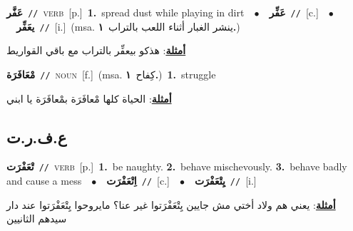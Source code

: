 \documentclass[10pt,a4paper,twoside]{article} %
\begin{document}
\begin{multicols}{2}
{\setlength\topsep{0pt}\textbf{\foreignlanguage{arabic}{عَفَّر}}\ {\color{gray}\texttt{//}\color{black}}\ \textsc{verb}\ [p.]\ \textbf{1.}~spread dust while playing in dirt\ \ $\bullet$\ \ \setlength\topsep{0pt}\textbf{\foreignlanguage{arabic}{عَفِّر}}\ {\color{gray}\texttt{//}\color{black}}\ [c.]\ \ $\bullet$\ \ \setlength\topsep{0pt}\textbf{\foreignlanguage{arabic}{يعَفِّر}}\ {\color{gray}\texttt{//}\color{black}}\ [i.]\ \color{gray}(msa. \foreignlanguage{arabic}{ينشر الغبار أثناء اللعب بالتراب}~\foreignlanguage{arabic}{\textbf{١.}})\color{black}\  \begin{flushright}\color{gray}\foreignlanguage{arabic}{\textbf{\underline{\foreignlanguage{arabic}{أمثلة}}}: هذكو بيعفِّر بالتراب مع باقي القواريط}\end{flushright}\color{black}} \vspace{2mm}

{\setlength\topsep{0pt}\textbf{\foreignlanguage{arabic}{مْعَافَرَة}}\ {\color{gray}\texttt{//}\color{black}}\ \textsc{noun}\ [f.]\ \color{gray}(msa. \foreignlanguage{arabic}{كِفاح}~\foreignlanguage{arabic}{\textbf{١.}})\color{black}\ \textbf{1.}~struggle\  \begin{flushright}\color{gray}\foreignlanguage{arabic}{\textbf{\underline{\foreignlanguage{arabic}{أمثلة}}}: الحياة كلها مْعافَرَة بمْعافَرَة يا ابني}\end{flushright}\color{black}} \vspace{2mm}

\vspace{-3mm}
\subsection*{\color{blue}\foreignlanguage{arabic}{ع.ف.ر.ت}\color{blue}{}} 

{\setlength\topsep{0pt}\textbf{\foreignlanguage{arabic}{تْعَفْرَت}}\ {\color{gray}\texttt{//}\color{black}}\ \textsc{verb}\ [p.]\ \textbf{1.}~be naughty.  \textbf{2.}~behave mischevously.  \textbf{3.}~behave badly and cause a mess\ \ $\bullet$\ \ \setlength\topsep{0pt}\textbf{\foreignlanguage{arabic}{اِتْعَفْرَت}}\ {\color{gray}\texttt{//}\color{black}}\ [c.]\ \ $\bullet$\ \ \setlength\topsep{0pt}\textbf{\foreignlanguage{arabic}{يِتْعَفْرَت}}\ {\color{gray}\texttt{//}\color{black}}\ [i.]\  \begin{flushright}\color{gray}\foreignlanguage{arabic}{\textbf{\underline{\foreignlanguage{arabic}{أمثلة}}}: يعني هم ولاد أختي مش جايين يِتْعَفْرَتوا غير عنا؟ مايروحوا يِتْعَفْرَتوا عند دار سيدهم الثانيين}\end{flushright}\color{black}} \vspace{2mm}


\end{multicols}
\end{document}
